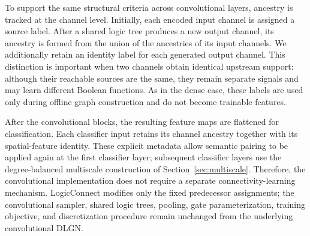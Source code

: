 To support the same structural criteria across convolutional layers, ancestry
is tracked at the channel level. Initially, each encoded input channel is
assigned a source label. After a shared logic tree produces a new output
channel, its ancestry is formed from the union of the ancestries of its input
channels. We additionally retain an identity label for each generated output
channel. This distinction is important when two channels obtain identical
upstream support: although their reachable sources are the same, they remain
separate signals and may learn different Boolean functions. As in the dense
case, these labels are used only during offline graph construction and do not
become trainable features.

After the convolutional blocks, the resulting feature maps are flattened for
classification. Each classifier input retains its channel ancestry together
with its spatial-feature identity. These explicit metadata allow semantic
pairing to be applied again at the first classifier layer; subsequent
classifier layers use the degree-balanced multiscale construction of
Section~\ref{sec:multiscale}. Therefore, the convolutional implementation does
not require a separate connectivity-learning mechanism. LogicConnect modifies
only the fixed predecessor assignments; the convolutional sampler, shared
logic trees, pooling, gate parameterization, training objective, and
discretization procedure remain unchanged from the underlying convolutional
DLGN.

